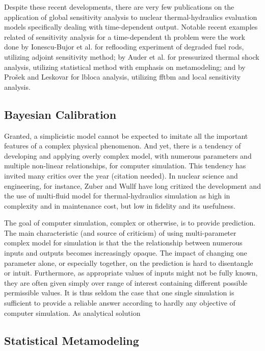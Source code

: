 Despite these recent developments, 
there are very few publications on the application of global sensitivity analysis to nuclear thermal-hydraulics evaluation models specifically dealing with time-dependent output.
Notable recent examples related of sensitivity analysis for a time-dependent \gls{th} problem were the work done by Ionescu-Bujor et al. \cite{Ionescu-Bujor2005} 
for reflooding experiment of degraded fuel rods, utilizing adjoint sensitivity method; 
by Auder et al. \cite{Auder2012} for pressurized thermal shock analysis, 
utilizing statistical method with emphasis on metamodeling; 
and by Prošek and Leskovar \cite{Prosek2015} for \gls{lbloca} analysis, 
utilizing \gls{fftbm} and local sensitivity analysis.

\subsection{Bayesian Calibration}
Granted, a simplicistic model cannot be expected to imitate all the important features of a complex physical phenomenon.
And yet, there is a tendency of developing and applying overly complex model, with numerous parameters and multiple non-linear relationships, for computer simulation.
This tendency has invited many critics over the year (citation needed).
In nuclear science and engineering, for instance, Zuber \cite{Zuber2001} and Wullf \cite{Wulff2007} have long critized the development and the use of multi-fluid model for thermal-hydraulics simulation as high in complexity and in maintenance cost, but low in fidelity and its usefulness.

The goal of computer simulation, complex or otherwise, is to provide prediction.
The main characteristic (and source of criticism) of using multi-parameter complex model for simulation is that the the relationship between numerous inputs and outputs becomes increasingly opaque.
The impact of changing one parameter alone, or especially together, on the prediction is hard to disentangle or intuit.
Furthermore, as appropriate values of inputs might not be fully known, they are often given simply over range of interest containing different possible permissible values.
It is thus seldom the case that one single simulation is sufficient to provide a reliable answer according to hardly any objective of computer simulation.
As analytical solution


\subsection{Statistical Metamodeling}\label{sub:intro_statistical_metamodeling}

